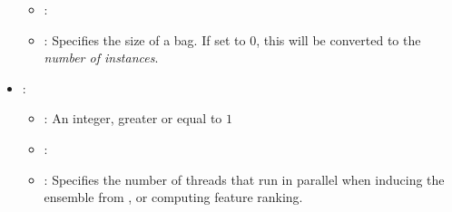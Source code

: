 \begin{itemize}
\begin{itemize}
                \item \optionDefaultValue{}: 
                \item \optionDescrption{}: Specifies the size of a bag. If set to $0$, this will be converted to the \emph{number of instances}.
           \end{itemize}
    \item {}:
           \begin{itemize}
                \item \optionPossibleValues{}: An integer, greater or equal to $1$
                \item \optionDefaultValue{}: 
                \item \optionDescrption{}: Specifies the number of threads that run in parallel when inducing the ensemble from ,
                or computing  feature ranking.
           \end{itemize}
\end{itemize}




